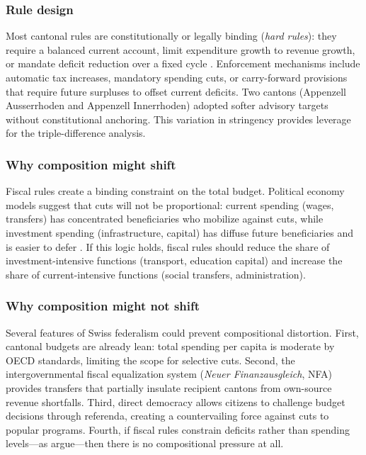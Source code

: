 \documentclass[12pt]{article}
\begin{document}
\subsubsection*{Rule design} Most cantonal rules are constitutionally or legally binding (\textit{hard rules}): they require a balanced current account, limit expenditure growth to revenue growth, or mandate deficit reduction over a fixed cycle \citep{burret2018multidimensional}. Enforcement mechanisms include automatic tax increases, mandatory spending cuts, or carry-forward provisions that require future surpluses to offset current deficits. Two cantons (Appenzell Ausserrhoden and Appenzell Innerrhoden) adopted softer advisory targets without constitutional anchoring. This variation in stringency provides leverage for the triple-difference analysis.

\subsubsection*{Why composition might shift} Fiscal rules create a binding constraint on the total budget. Political economy models suggest that cuts will not be proportional: current spending (wages, transfers) has concentrated beneficiaries who mobilize against cuts, while investment spending (infrastructure, capital) has diffuse future beneficiaries and is easier to defer \citep{blanchard2005fiscal, ardagna2007fiscal}. If this logic holds, fiscal rules should reduce the share of investment-intensive functions (transport, education capital) and increase the share of current-intensive functions (social transfers, administration).

\subsubsection*{Why composition might not shift} Several features of Swiss federalism could prevent compositional distortion. First, cantonal budgets are already lean: total spending per capita is moderate by OECD standards, limiting the scope for selective cuts. Second, the intergovernmental fiscal equalization system (\textit{Neuer Finanzausgleich}, NFA) provides transfers that partially insulate recipient cantons from own-source revenue shortfalls. Third, direct democracy allows citizens to challenge budget decisions through referenda, creating a countervailing force against cuts to popular programs. Fourth, if fiscal rules constrain deficits rather than spending levels---as \citet{luechinger2013fiscal} argue---then there is no compositional pressure at all.
\end{document}
